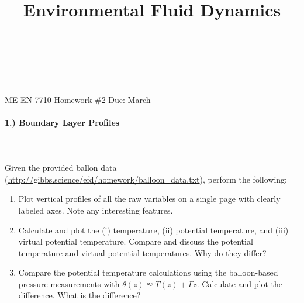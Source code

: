 \documentclass[11pt]{article}
\makeatletter
\newcommand{\linia}{\rule{\linewidth}{0.5pt}}
\renewcommand{\maketitle}{
\begin{center}
\vspace{2ex}
{\huge \textsc{\@title}}
\vspace{1ex}
\\
\linia\\
ME EN 7710 \hfill Homework \#2 \hfill Due: March \nth{24}
\vspace{4ex}
\end{center}
}
\makeatother
\begin{document}
\title{Environmental Fluid Dynamics}

\maketitle

\vspace{-20pt}
\paragraph{1.) Boundary Layer Profiles}~\\\\
Given the provided ballon data (\href{http://gibbs.science/efd/homework/balloon_data.txt}{http://gibbs.science/efd/homework/balloon\_data.txt}), perform the following:
\begin{enumerate}[label=(\alph*)]
	\item Plot vertical profiles of all the raw variables on a single page with clearly labeled axes. Note any interesting features.
	\item Calculate and plot the (i) temperature, (ii) potential temperature, and (iii) virtual potential temperature. Compare and discuss the potential temperature and virtual potential temperatures. Why do they differ?
	\item Compare the potential temperature calculations using the balloon-based pressure measurements with $\theta(z) \approxeq T(z)+ \Gamma z$. Calculate and plot the difference. What is the difference?
\end{enumerate}
 
\end{document}
